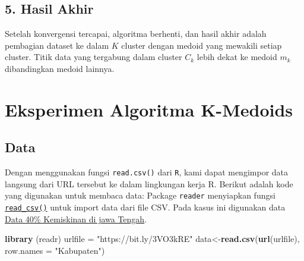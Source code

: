 \documentclass[
  oneside]{book}
\newenvironment{Shaded}{\begin{snugshade}}{\end{snugshade}}
\newcommand{\AttributeTok}[1]{\textcolor[rgb]{0.13,0.29,0.53}{#1}}
\newcommand{\FunctionTok}[1]{\textcolor[rgb]{0.13,0.29,0.53}{\textbf{#1}}}
\newcommand{\NormalTok}[1]{#1}
\newcommand{\OtherTok}[1]{\textcolor[rgb]{0.56,0.35,0.01}{#1}}
\newcommand{\StringTok}[1]{\textcolor[rgb]{0.31,0.60,0.02}{#1}}
\begin{document}
\subsection*{5. Hasil Akhir}\label{hasil-akhir-1}

Setelah konvergensi tercapai, algoritma berhenti, dan hasil akhir adalah pembagian dataset ke dalam \(K\) cluster dengan medoid yang mewakili setiap cluster. Titik data yang tergabung dalam cluster \(C_k\) lebih dekat ke medoid \(m_k\) dibandingkan medoid lainnya.

\section{Eksperimen Algoritma K-Medoids}\label{eksperimen-algoritma-k-medoids}

\subsection*{Data}\label{data-1}

Dengan menggunakan fungsi \texttt{read.csv()} dari \texttt{R}, kami dapat mengimpor data langsung dari URL tersebut ke dalam lingkungan kerja R. Berikut adalah kode yang digunakan untuk membaca data: Package \texttt{reader} menyiapkan fungsi \href{https://readr.tidyverse.org/reference/read_delim.html}{\texttt{read\_csv()}} untuk import data dari file CSV. Pada kasus ini digunakan data \href{https://github.com/dedenistiawan/Dataset/blob/main/BDT.csv}{Data 40\% Kemiskinan di jawa Tengah}.

\begin{Shaded}
\begin{Highlighting}[]
\FunctionTok{library}\NormalTok{ (readr)}
\NormalTok{urlfile }\OtherTok{=} \StringTok{"https://bit.ly/3VO3kRE"}
\NormalTok{data}\OtherTok{\textless{}{-}}\FunctionTok{read.csv}\NormalTok{(}\FunctionTok{url}\NormalTok{(urlfile), }\AttributeTok{row.names =} \StringTok{"Kabupaten"}\NormalTok{)}
\end{Highlighting}
\end{Shaded}
\end{document}
